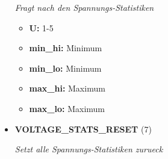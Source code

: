 \begin{itemize}
\textit{Fragt nach den Spannungs-Statistiken}

\small
\begin{itemize}
		
\item \textbf{U:} 1-5
\item \textbf{min\_hi:} Minimum
\item \textbf{min\_lo:} Minimum
\item \textbf{max\_hi:} Maximum
\item \textbf{max\_lo:} Maximum
\end{itemize}
\normalsize
	
\item \textbf{VOLTAGE\_STATS\_RESET} (7)

\textit{Setzt alle Spannungs-Statistiken zurueck}

\end{itemize}
	
